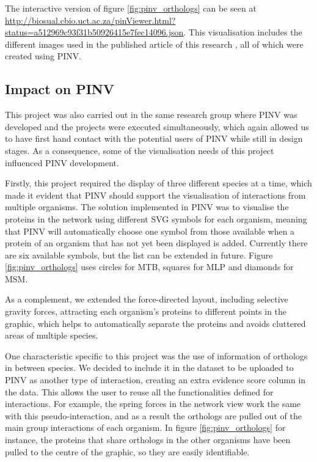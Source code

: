 The interactive version of figure \ref{fig:pinv_orthologs} can be seen at \url{http://biosual.cbio.uct.ac.za/pinViewer.html?status=a512969c93f31b50926415e7fec14096.json}. This visualisation includes the different images used in the published article of this research \cite{AKI2013}, all of which were created using PINV.

\subsection{Impact on PINV}
This project was also carried out in the same research group where PINV was developed and the projects were executed simultaneously, which again allowed us to have first hand contact with the potential users of PINV while still in design stages. As a consequence, some of the visualisation needs of this project influenced PINV development.

Firstly, this project required the display of three different species at a time, which made it evident that PINV should support the visualisation of interactions from multiple organisms. The  solution implemented in PINV was to visualise the proteins in the network using different SVG symbols for each organism,  meaning that PINV will automatically choose one symbol from those available when a protein of an organism that has not yet been displayed is added. Currently there are six available symbols, but the list can be extended in future. Figure \ref{fig:pinv_orthologs} uses circles for MTB, squares for MLP and diamonds for MSM.

As a complement, we extended the force-directed layout, including selective gravity forces, attracting each organism's proteins to different points in the graphic, which helps to automatically separate the proteins and avoids cluttered areas of multiple species.

One characteristic specific to this project was the use of information of orthologs in between species. We decided to include it in the dataset to be uploaded to PINV as another type of interaction, creating an extra evidence score column in the data. This allows the user to reuse all the functionalities defined for interactions. For example, the spring forces in the network view work the same with this pseudo-interaction, and as a result the orthologs are pulled out of the main group interactions of each organism. In figure \ref{fig:pinv_orthologs} for instance, the proteins that share orthologs in the other organisms have been pulled to the centre of the graphic, so they are easily identifiable.


